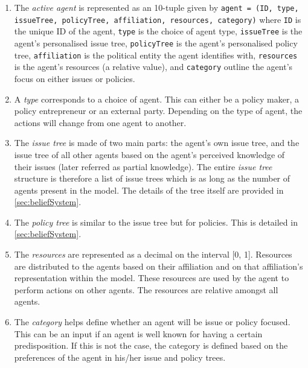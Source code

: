 \documentclass[11pt]{article}
\begin{document}
\begin{enumerate}

\item The \emph{active agent} is represented as an 10-tuple given by \texttt{agent = (ID, type, issueTree, policyTree, affiliation, resources, category)} where
\texttt{ID} is the unique ID of the agent,
\texttt{type} is the choice of agent type, 
\texttt{issueTree} is the agent's personalised issue tree, 
\texttt{policyTree} is the agent's personalised policy tree, 
\texttt{affiliation} is the political entity the agent identifies with,  
\texttt{resources} is the agent's resources (a relative value), and 
\texttt{category} outline the agent's focus on either issues or policies.

\item A \emph{type} corresponds to a choice of agent. This can either be a policy maker, a policy entrepreneur or an external party. Depending on the type of agent, the actions will change from one agent to another.

\item The \emph{issue tree} is made of two main parts: the agent's own issue tree, and the issue tree of all other agents based on the agent's perceived knowledge of their issues (later referred as partial knowledge). The entire \emph{issue tree} structure is therefore a list of issue trees which is as long as the number of agents present in the model. The details of the tree itself are provided in \autoref{sec:beliefSystem}.

\item The \emph{policy tree} is similar to the issue tree but for policies. This is detailed in \autoref{sec:beliefSystem}.

\item The \emph{resources} are represented as a decimal on the interval [0, 1]. Resources are distributed to the agents based on their affiliation and on that affiliation's representation within the model. These resources are used by the agent to perform actions on other agents. The resources are relative amongst all agents.

\item The \emph{category} helps define whether an agent will be issue or policy focused. This can be an input if an agent is well known for having a certain predisposition. If this is not the case, the category is defined based on the preferences of the agent in his/her issue and policy trees.

\end{enumerate}
\end{document}
